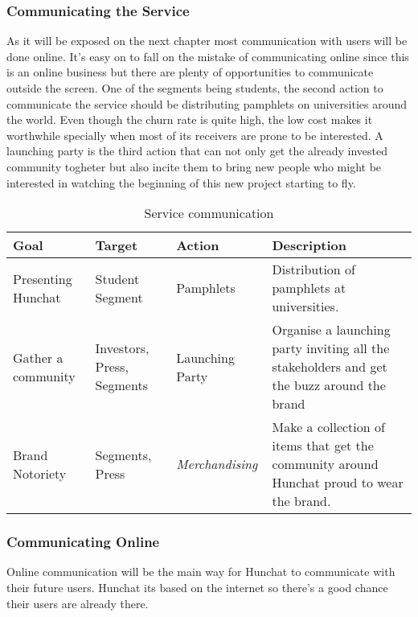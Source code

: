 \documentclass[12pt]{article}
\begin{document}
	\subsubsection{Communicating the Service}
	As it will be exposed on the next chapter most communication with users will be done online. It's easy on to fall on the mistake of communicating online since this is an online business but there are plenty of opportunities to communicate outside the screen. One of the segments being students, the second action to communicate the service should be distributing pamphlets on universities around the world. Even though the churn rate is quite high, the low cost makes it worthwhile specially when most of its receivers are prone to be interested. A launching party is the third action that can not only get the already invested community togheter but also incite them to bring new people who might be interested in watching the beginning of this new project starting to fly.
	
	\begin{table}[htbp]
	\small
	\caption{Service communication}
	\label{table:service}
	\centering
	\begin{tabular}{ @{}P{0.18\textwidth}P{0.17\textwidth}P{0.16\textwidth}P{0.38\textwidth} }
Goal	&	Target		&	Action	&	Description	 \\ \hline
Presenting Hunchat	&	Student Segment   &	Pamphlets	& 	Distribution of pamphlets at universities. \\
Gather a community & Investors, Press, Segments & Launching Party & Organise a launching party inviting all the stakeholders and get the buzz around the brand \\
Brand Notoriety & Segments, Press & \textit{Merchandising} & Make a collection of items that get the community around Hunchat proud to wear the brand.
	 \\ \hline
	\end{tabular}
	\end{table}

	\subsubsection{Communicating Online} \label{online}
	
	Online communication will be the main way for Hunchat to communicate with their future users. Hunchat its based on the internet so there's a good chance their users are already there.
	
\end{document}

